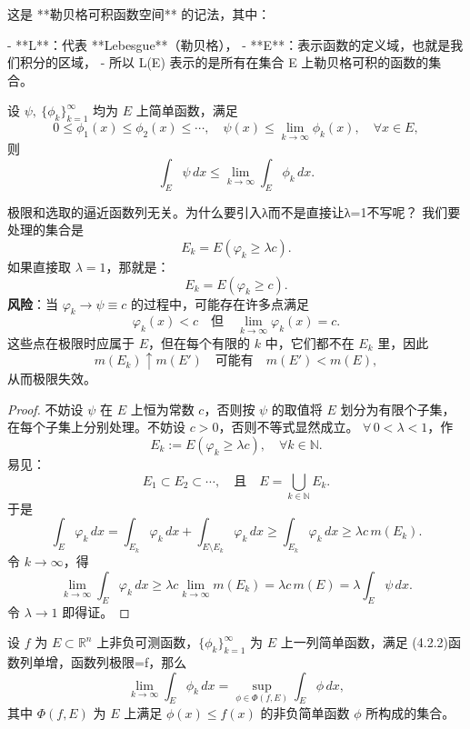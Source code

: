 \documentclass[lang=cn,10pt]{elegantbook}
\begin{document}
这是 **勒贝格可积函数空间** 的记法，其中：

- **L**：代表 **Lebesgue**（勒贝格），
- **E**：表示函数的定义域，也就是我们积分的区域，
- 所以 L(E) 表示的是所有在集合 E 上勒贝格可积的函数的集合。
\begin{lemma}[4.2.1]
设 $\psi,\ \{\phi_k\}_{k=1}^\infty$ 均为 $E$ 上简单函数，满足
\[
0 \le \phi_1(x) \le \phi_2(x) \le \cdots,\quad 
\psi(x) \le \lim_{k \to \infty} \phi_k(x),\quad \forall x \in E,
\]
则
\[
\int_E \psi\, dx \le \lim_{k \to \infty} \int_E \phi_k\, dx.
\]
\end{lemma}
极限和选取的逼近函数列无关。为什么要引入λ而不是直接让λ=1不写呢？
我们要处理的集合是
\[
E_k = E(\varphi_k \ge \lambda c).
\]
如果直接取 $\lambda = 1$，那就是：
\[
E_k = E(\varphi_k \ge c).
\]
\textbf{风险}：当 $\varphi_k \to \psi \equiv c$ 的过程中，可能存在许多点满足
\[
\varphi_k(x) < c \quad \text{但} \quad \lim_{k\to\infty} \varphi_k(x) = c.
\]
这些点在极限时应属于 $E$，但在每个有限的 $k$ 中，它们都不在 $E_k$ 里，因此
\[
m(E_k) \uparrow m(E') \quad \text{可能有} \quad m(E') < m(E),
\]
从而极限失效。
\begin{proof}
不妨设 $\psi$ 在 $E$ 上恒为常数 $c$，否则按 $\psi$ 的取值将 $E$ 划分为有限个子集，
在每个子集上分别处理。不妨设 $c>0$，否则不等式显然成立。  
$\forall\, 0<\lambda<1$，作
\[
E_k := E(\varphi_k \ge \lambda c), \quad \forall k \in \mathbb{N}.
\]
易见：
\[
E_1 \subset E_2 \subset \cdots, \quad 且 \quad E = \bigcup_{k\in\mathbb{N}} E_k.
\]
于是
\[
\int_E \varphi_k \, dx
= \int_{E_k} \varphi_k \, dx + \int_{E\setminus E_k} \varphi_k \, dx
\ge \int_{E_k} \varphi_k \, dx
\ge \lambda c\, m(E_k).
\]
令 $k \to \infty$，得
\[
\lim_{k\to\infty} \int_E \varphi_k \, dx
\ge \lambda c \lim_{k\to\infty} m(E_k)
= \lambda c\, m(E)
= \lambda \int_E \psi \, dx.
\]
令 $\lambda \to 1$ 即得证。
\end{proof}
\begin{theorem}[4.2.1]
设 $f$ 为 $E \subset \mathbb{R}^n$ 上非负可测函数，$\{\phi_k\}_{k=1}^\infty$ 为 $E$ 上一列简单函数，满足 (4.2.2)函数列单增，函数列极限=f，那么
\[
\lim_{k \to \infty} \int_E \phi_k \, dx
= \sup_{\phi \in \Phi(f, E)} \int_E \phi \, dx,
\]
其中 $\Phi(f,E)$ 为 $E$ 上满足 $\phi(x) \le f(x)$ 的非负简单函数 $\phi$ 所构成的集合。
\end{theorem}
\end{document}
